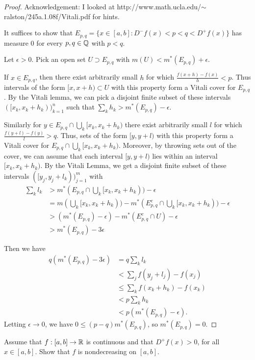 \documentclass{article}
\begin{document}
\begin{proof}
Acknowledgement: I looked at http://www.math.ucla.edu/$\sim$ralston/245a.1.08f/Vitali.pdf for hints.

It suffices to show that $E_{p,q} = \{x \in [a,b] : D^-f(x) < p < q < D^+f(x)\}$ has measure $0$ for every $p,q \in \mathbb{Q}$ with $p < q$. 

Let $\epsilon > 0$. Pick an open set $U \supset E_{p,q}$ with $m(U) < m^*(E_{p,q}) + \epsilon$.

If $x \in E_{p,q}$, then there exist arbitrarily small $h$ for which $\frac{f(x+h) - f(x)}{h} < p$.  
Thus intervals of the form $[x, x+h) \subset U$ with this property form a Vitali cover for $E_{p,q}$. 
By the Vitali lemma, we can pick
a disjoint finite subset of these intervals $([x_k, x_k + h_k))_{k=1}^n$ such that $\sum_k h_k > m^*(E_{p,q}) - \epsilon$.

Similarly for $y \in E_{p,q} \cap \bigcup_k [x_k, x_k + h_k)$ there exist arbitrarily small $l$ for which $\frac{f(y+l) - f(y)}{l} > q$.  Thus,
sets of the form $[y, y+l)$ with this property form a Vitali cover for $E_{p,q} \cap \bigcup_k [x_k, x_k + h_k)$.  
Moreover, by throwing sets out of the cover, we can assume that each interval $[y, y+l)$ lies within an interval $[x_k, x_k + h_k)$.
By the Vitali Lemma, we get a disjoint finite subset of these intervals $([y_j, y_j + l_k))_{j=1}^m$ with 
\begin{align*}
\sum_k l_k & > m^*(E_{p,q} \cap \bigcup_k [x_k, x_k + h_k)) - \epsilon 
\\ & = m(\bigcup_k [x_k, x_k + h_k)) - m^*(E_{p,q}^c \cap \bigcup_k [x_k, x_k + h_k)) - \epsilon 
\\ & > (m^*(E_{p,q}) - \epsilon) - m^*(E_{p,q}^c \cap U) - \epsilon
\\ & > m^*(E_{p,q}) - 3 \epsilon
\end{align*}

Then we have
\begin{align*}
q(m^*(E_{p,q}) - 3 \epsilon)  &   = q \sum_k l_k
\\ & < \sum_j f(y_j + l_j) - f(x_j) 
\\ & \le \sum_k f(x_k + h_k) - f(x_k)
\\ & < p \sum_k h_k 
\\ & < p (m^*(E_{p,q}) - \epsilon).
\end{align*}
Letting $\epsilon \to 0$, we have $0 \le (p-q) m^*(E_{p,q})$, so  $m^*(E_{p,q}) = 0$.
\end{proof}

 Assume that $f: [a,b] \to \mathbb{R}$ is continuous and that $D^+f(x) > 0$, for all $x \in [a,b]$.
Show that $f$ is nondecreasing on $[a,b]$.
\end{document}
